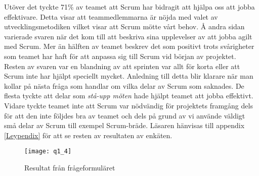 Utöver det tyckte 71\% av teamet att Scrum har bidragit att hjälpa oss att jobba effektivare. Detta visar att teammedlemmarna är nöjda med valet av utvecklingsmetodiken vilket visar att Scrum mötte vårt behov. Å andra sidan varierade svaren när det kom till att beskriva sina upplevelser av att jobba agilt med Scrum. Mer än hälften av teamet beskrev det som positivt trots svårigheter som teamet har haft för att anpassa sig till Scrum vid början av projektet. Resten av svaren var en blandning av att sprinten var allt för korta eller att Scrum inte har hjälpt speciellt mycket. Anledning till detta blir klarare när man kollar på nästa fråga som handlar om vilka delar av Scrum som saknades. De flesta tyckte att delar som \textit{stå-upp möten} hade  hjälpt teamet att jobba effektivt. Vidare tyckte teamet inte att Scrum var nödvändig för projektets framgång dels för att den inte följdes bra av teamet och dels på grund av vi använde väldigt små delar av Scrum till exempel Scrum-bräde.
Läsaren hänvisas till appendix \ref{Leypendix} för att se resten av resultaten av enkäten.
\begin{figure*}[h]
	\centering
	\texttt{[image: q1\_4]}
	\caption{Resultat från frågeformuläret}\label{fig1}
	\label{q1}
\end{figure*}
\newpage